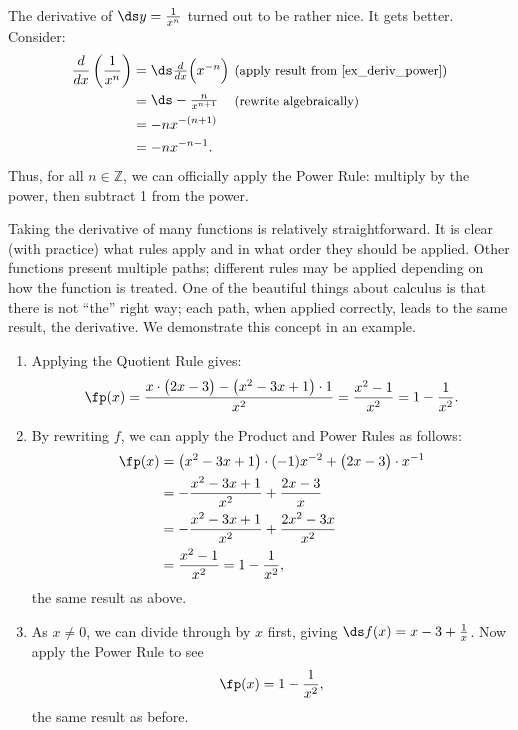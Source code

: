The derivative of $\ds y=\frac{1}{x^n}$ turned out to be rather nice. It gets better. Consider:
\begin{align*}
	\frac{d}{dx}\left(\frac{1}{x^n}\right)
	&= \parbox{60pt}{$\ds\frac{d}{dx}\Big(x^{-n}\Big)$}
	\text{\small (apply result from \autoref{ex_deriv_power})}\\
	&= \parbox{60pt}{$\ds-\frac{n}{x^{n+1}}$}\text{\small (rewrite algebraically)} \\
	&= -nx^{-(n+1)} \\
	&= -nx^{-n-1}.
\end{align*}
Thus, for all $n\in\mathbb{Z}$, we can officially apply the Power Rule: multiply by the power, then subtract 1 from the power.

Taking the derivative of many functions is relatively straightforward. It is clear (with practice) what rules apply and in what order they should be applied. Other functions present multiple paths; different rules may be applied depending on how the function is treated. One of the beautiful things about calculus is that there is not ``the'' right way; each path, when applied correctly, leads to the same result, the derivative. We demonstrate this concept in an example.\\

{\begin{enumerate}
	\item	Applying the Quotient Rule gives: $$ \fp(x) = \frac{x\cdot\big(2x-3\big)-\big(x^2-3x+1\big)\cdot 1}{x^2} = \frac{x^2-1}{x^2} = 1-\frac{1}{x^2}.$$
	\item	By rewriting $f$, we can apply the Product and Power Rules as follows:
	\begin{align*}
		\fp(x)
		&= \big(x^2-3x+1\big)\cdot (-1)x^{-2} + \big(2x-3\big)\cdot x^{-1} \\
		&= -\frac{x^2-3x+1}{x^2}+\frac{2x-3}{x} \\
		&= -\frac{x^2-3x+1}{x^2}+\frac{2x^2-3x}{x^2}\\
		&= \frac{x^2-1}{x^2} = 1-\frac{1}{x^2},
	\end{align*}
	the same result as above.
	\item	As $x\neq 0$, we can divide through by $x$ first, giving $\ds f(x) = x-3+\frac{1}x$. Now apply the Power Rule to see $$\fp(x) = 1-\frac{1}{x^2},$$  the same result as before.\eoehere
\end{enumerate}}

